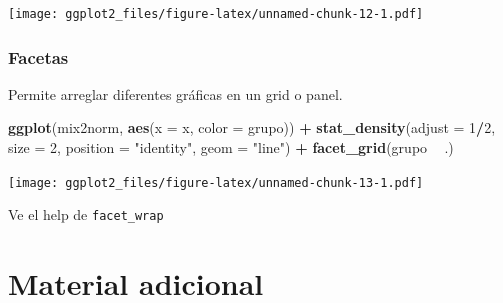 \documentclass[]{article}
\newenvironment{Shaded}{\begin{snugshade}}{\end{snugshade}}
\newcommand{\KeywordTok}[1]{\textcolor[rgb]{0.13,0.29,0.53}{\textbf{#1}}}
\newcommand{\DataTypeTok}[1]{\textcolor[rgb]{0.13,0.29,0.53}{#1}}
\newcommand{\DecValTok}[1]{\textcolor[rgb]{0.00,0.00,0.81}{#1}}
\newcommand{\StringTok}[1]{\textcolor[rgb]{0.31,0.60,0.02}{#1}}
\newcommand{\OperatorTok}[1]{\textcolor[rgb]{0.81,0.36,0.00}{\textbf{#1}}}
\newcommand{\NormalTok}[1]{#1}
\begin{document}
\texttt{[image: ggplot2\_files/figure-latex/unnamed-chunk-12-1.pdf]}

\subsubsection{Facetas}\label{facetas}

Permite arreglar diferentes gráficas en un grid o panel.

\begin{Shaded}
\begin{Highlighting}[]
\KeywordTok{ggplot}\NormalTok{(mix2norm, }\KeywordTok{aes}\NormalTok{(}\DataTypeTok{x =}\NormalTok{ x, }\DataTypeTok{color =}\NormalTok{ grupo)) }\OperatorTok{+}\StringTok{ }
\StringTok{  }\KeywordTok{stat_density}\NormalTok{(}\DataTypeTok{adjust =} \DecValTok{1}\OperatorTok{/}\DecValTok{2}\NormalTok{, }\DataTypeTok{size =} \DecValTok{2}\NormalTok{, }\DataTypeTok{position =} \StringTok{"identity"}\NormalTok{, }\DataTypeTok{geom =} \StringTok{"line"}\NormalTok{) }\OperatorTok{+}
\StringTok{  }\KeywordTok{facet_grid}\NormalTok{(grupo }\OperatorTok{~}\StringTok{ }\NormalTok{.)}
\end{Highlighting}
\end{Shaded}

\texttt{[image: ggplot2\_files/figure-latex/unnamed-chunk-13-1.pdf]}

Ve el help de \texttt{facet\_wrap}

\section{Material adicional}\label{material-adicional}
\end{document}
